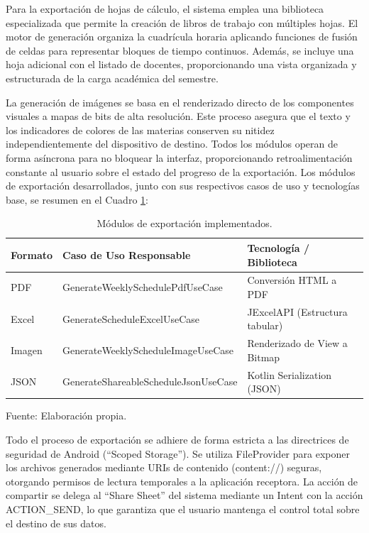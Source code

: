 Para la exportación de hojas de cálculo, el sistema emplea una biblioteca especializada que permite la creación de libros de trabajo con múltiples hojas. El motor de generación organiza la cuadrícula horaria aplicando funciones de fusión de celdas para representar bloques de tiempo continuos. Además, se incluye una hoja adicional con el listado de docentes, proporcionando una vista organizada y estructurada de la carga académica del semestre.

La generación de imágenes se basa en el renderizado directo de los componentes visuales a mapas de bits de alta resolución. Este proceso asegura que el texto y los indicadores de colores de las materias conserven su nitidez independientemente del dispositivo de destino. Todos los módulos operan de forma asíncrona para no bloquear la interfaz, proporcionando retroalimentación constante al usuario sobre el estado del progreso de la exportación.
Los módulos de exportación desarrollados, junto con sus respectivos casos de uso y tecnologías base, se resumen en el Cuadro \ref{tab:modulos_exportacion}:

\begin{table}[H]
\centering
\begin{tabularx}{\linewidth}{@{}p{1.5cm}>{\raggedright\arraybackslash}X>{\raggedright\arraybackslash}p{4cm}@{}}
\toprule
Formato & Caso de Uso Responsable & Tecnología / Biblioteca \\
\midrule
PDF  & GenerateWeeklySchedulePdfUseCase & Conversión HTML a PDF \\
Excel  & GenerateScheduleExcelUseCase & JExcelAPI (Estructura tabular) \\
Imagen & GenerateWeeklyScheduleImageUseCase & Renderizado de View a Bitmap \\
JSON & GenerateShareableScheduleJsonUseCase & Kotlin Serialization (JSON) \\
\bottomrule
\end{tabularx}
\caption{Módulos de exportación implementados.}\label{tab:modulos_exportacion}
Fuente: Elaboración propia.
\end{table}

Todo el proceso de exportación se adhiere de forma estricta a las directrices de seguridad de Android (``Scoped Storage''). Se utiliza FileProvider para exponer los archivos generados mediante URIs de contenido (content://) seguras, otorgando permisos de lectura temporales a la aplicación receptora. La acción de compartir se delega al ``Share Sheet'' del sistema mediante un Intent con la acción ACTION\_SEND, lo que garantiza que el usuario mantenga el control total sobre el destino de sus datos.

